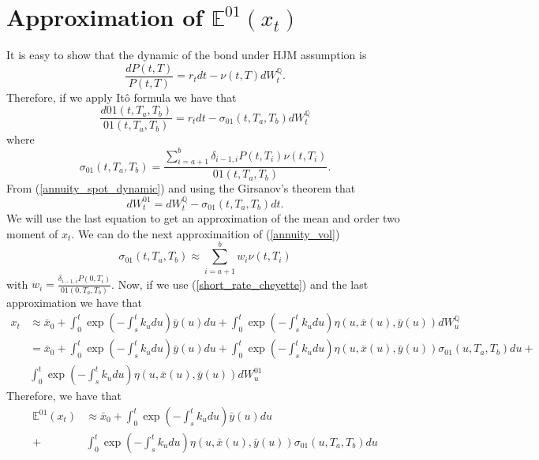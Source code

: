 \documentclass[a4paper,10pt]{article}
\newcommand{\1}{\mathbf{1}}
\begin{document}
\section{Approximation of $\mathbb{E}^{01}\left(x_t\right)$}
It is easy to show that the dynamic of the bond under HJM assumption is
\begin{equation}
\frac{dP(t,T)}{P(t,T)} = r_t dt - \nu(t,T)dW^{\mathbb{Q}}_t.  
\end{equation}
Therefore, if we apply Itô formula we have that 
\begin{equation}\label{annuity_spot_dynamic}
\frac{d01(t,T_a,T_b)}{01(t,T_a,T_b)} = r_t dt - \sigma_{01}(t,T_a,T_b)dW^{\mathbb{Q}}_t
\end{equation}
where 
\begin{equation} \label{annuity_vol}
\sigma_{01}(t,T_a,T_b) = \frac{\sum_{i=a+1}^{b} \delta_{i-1,i} P(t,T_i) \nu(t,T_i)}{01(t,T_a,T_b)}.
\end{equation}
From (\ref{annuity_spot_dynamic}) and using the Girsanov's theorem that 
\begin{equation*}
dW^{01}_t = dW^{\mathbb{Q}}_t - \sigma_{01}(t,T_a,T_b)dt. 
\end{equation*}
We will use the last equation to get an approximation of the mean and order two moment of $x_t$. We can do the next approximaition of  (\ref{annuity_vol})
\begin{equation}
\sigma_{01}(t,T_a,T_b) \approx \sum_{i=a+1}^{b} w_i \nu(t,T_i)
\end{equation}
with $w_i=\frac{\delta_{i-1,i} P(0,T_i)}{01(0,T_a,T_b)}$. Now, if we use (\ref{short_rate_cheyette}) and the last approximation we have that
\begin{align}
x_t &\approx \bar{x}_0  + \int_{0}^{t} \exp\left(-\int_{s}^{t}k_u du\right) \bar{y}(u) du + \int_{0}^{t}  \exp\left(-\int_{s}^{t}k_u du \right) \eta(u,\bar{x}(u),\bar{y}(u)) dW_u^{\mathbb{Q}} \nonumber \\
&=  \bar{x}_0  + \int_{0}^{t} \exp\left(-\int_{s}^{t}k_u du\right) \bar{y}(u) du + \int_{0}^{t} \exp\left(-\int_{s}^{t}k_u du \right) \eta(u,\bar{x}(u),\bar{y}(u)) \sigma_{01}(u, T_a, T_b) du  + \nonumber \\ 
& \int_{0}^{t} \exp\left(-\int_{s}^{t}k_u du \right) \eta(u,\bar{x}(u),\bar{y}(u)) dW_u^{01} 
\end{align}
Therefore, we have that
\begin{align}
\mathbb{E}^{01}\left(x_t\right) &\approx \bar{x}_0  + \int_{0}^{t} \exp\left(-\int_{s}^{t}k_u du\right) \bar{y}(u) du \nonumber \\ 
+ &\int_{0}^{t} \exp\left(-\int_{s}^{t}k_u du \right) \eta(u,\bar{x}(u),\bar{y}(u)) \sigma_{01}(u, T_a, T_b) du
\end{align}
\end{document}
